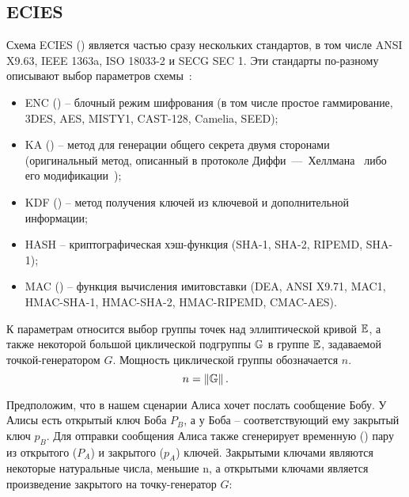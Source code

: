 \subsection{ECIES}

Схема ECIES () является частью сразу нескольких стандартов, в том числе ANSI X9.63, IEEE 1363a, ISO 18033-2 и SECG SEC 1. Эти стандарты по-разному описывают выбор параметров схемы~\cite{Martinez:Encinas:Avila:2010}:

\begin{itemize}
	\item ENC () -- блочный режим шифрования (в том числе простое гаммирование, 3DES, AES, MISTY1, CAST-128, Camelia, SEED);
	\item KA () -- метод для генерации общего секрета двумя сторонами (оригинальный метод, описанный в протоколе Диффи~---~Хеллмана~\cite{Diffie:Hellman:1976} либо его модификации~\cite{Miller:1986});
	\item KDF () -- метод получения ключей из ключевой и дополнительной информации;
	\item HASH -- криптографическая хэш-функция (SHA-1, SHA-2, RIPEMD, SHA-1);
	\item MAC () -- функция вычисления имитовставки (DEA, ANSI X9.71, MAC1, HMAC-SHA-1, HMAC-SHA-2, HMAC-RIPEMD, CMAC-AES).
\end{itemize}

К параметрам относится выбор группы точек над эллиптической кривой $\mathbb{E}$, а также некоторой большой циклической подгруппы $\mathbb{G}$ в группе $\mathbb{E}$, задаваемой точкой-генератором $G$. Мощность циклической группы обозначается $n$.
\[n = \left\| \mathbb{G} \right\|.\]

Предположим, что в нашем сценарии Алиса хочет послать сообщение Бобу. У Алисы есть открытый ключ Боба $P_B$, а у Боба -- соответствующий ему закрытый ключ $p_B$. Для отправки сообщения Алиса также сгенерирует временную () пару из открытого ($P_A$) и закрытого ($p_A$) ключей. Закрытыми ключами являются некоторые натуральные числа, меньшие n, а открытыми ключами является произведение закрытого на точку-генератор $G$:

